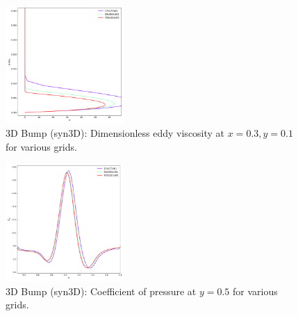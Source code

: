 \begin{figure}[ht!]
    \centering
    \includegraphics[width=0.4\textwidth]{figs/3dbump/x03y01REV_study.pdf}
    \caption{3D Bump (syn3D): Dimensionless eddy viscosity at $x=0.3,y=0.1$ for various grids.}
    \label{fig:syn3dbumpmutstudy}
\end{figure}

\begin{figure}[ht!]
    \centering
    \includegraphics[width=0.4\textwidth]{figs/3dbump/cop050study.pdf}
    \caption{3D Bump (syn3D): Coefficient of pressure at $y=0.5$ for various grids.}
    \label{fig:syn3dbumpcpstudy}
\end{figure}
